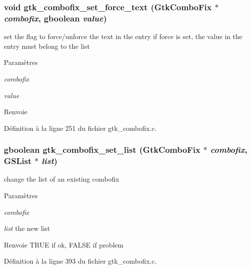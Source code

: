 \subsubsection[{gtk\_\-combofix\_\-set\_\-force\_\-text}]{\setlength{\rightskip}{0pt plus 5cm}void gtk\_\-combofix\_\-set\_\-force\_\-text ({\bf GtkComboFix} $\ast$ {\em combofix}, \/  gboolean {\em value})}\label{gtk__combofix_8h_af698335af63e4952d8c35d912732b4e4}
set the flag to force/unforce the text in the entry if force is set, the value in the entry must belong to the list


\begin{DoxyParams}{Paramètres}
\item[{\em combofix}]\item[{\em value}]\end{DoxyParams}
\begin{DoxyReturn}{Renvoie}

\end{DoxyReturn}


Définition à la ligne 251 du fichier gtk\_\-combofix.c.

\subsubsection[{gtk\_\-combofix\_\-set\_\-list}]{\setlength{\rightskip}{0pt plus 5cm}gboolean gtk\_\-combofix\_\-set\_\-list ({\bf GtkComboFix} $\ast$ {\em combofix}, \/  GSList $\ast$ {\em list})}\label{gtk__combofix_8h_a7bfb57437f2c49510aa9eb2669dd133d}
change the list of an existing combofix


\begin{DoxyParams}{Paramètres}
\item[{\em combofix}]\item[{\em list}]the new list\end{DoxyParams}
\begin{DoxyReturn}{Renvoie}
TRUE if ok, FALSE if problem 
\end{DoxyReturn}


Définition à la ligne 393 du fichier gtk\_\-combofix.c.

